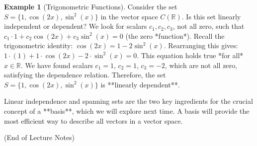 \documentclass[11pt]{article}
\theoremstyle{definition}
\newtheorem{example}[theorem]{Example}
\theoremstyle{remark}
\newcommand{\R}{\mathbb{R}}
\begin{document}
\begin{example}[Trigonometric Functions]
Consider the set $S = \{1, \cos(2x), \sin^2(x)\}$ in the vector space $C(\R)$. Is this set linearly independent or dependent?
We look for scalars $c_1, c_2, c_3$, not all zero, such that $c_1 \cdot 1 + c_2 \cos(2x) + c_3 \sin^2(x) = 0$ (the zero *function*).
Recall the trigonometric identity: $\cos(2x) = 1 - 2\sin^2(x)$.
Rearranging this gives: $1 \cdot (1) + 1 \cdot \cos(2x) - 2 \cdot \sin^2(x) = 0$.
This equation holds true *for all* $x \in \R$. We have found scalars $c_1 = 1$, $c_2 = 1$, $c_3 = -2$, which are not all zero, satisfying the dependence relation.
Therefore, the set $S = \{1, \cos(2x), \sin^2(x)\}$ is **linearly dependent**.
\end{example}

Linear independence and spanning sets are the two key ingredients for the crucial concept of a **basis**, which we will explore next time. A basis will provide the most efficient way to describe all vectors in a vector space.

\medskip
(End of Lecture Notes)
\end{document}
